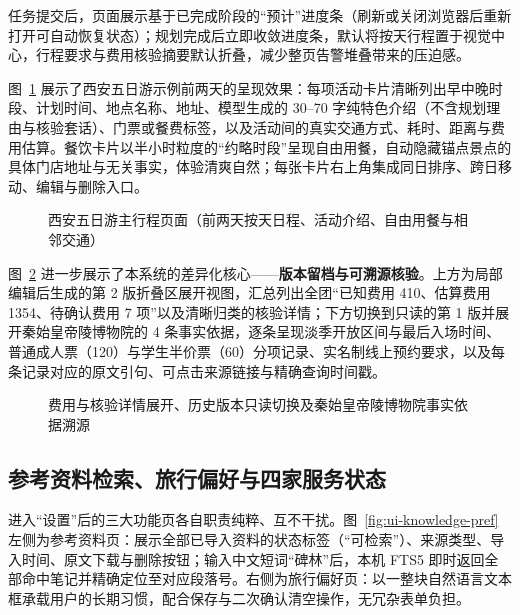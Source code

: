 任务提交后，页面展示基于已完成阶段的“预计”进度条（刷新或关闭浏览器后重新打开可自动恢复状态）；规划完成后立即收敛进度条，默认将按天行程置于视觉中心，行程要求与费用核验摘要默认折叠，减少整页告警堆叠带来的压迫感。

图~\ref{fig:ui-itinerary-5days} 展示了西安五日游示例前两天的呈现效果：每项活动卡片清晰列出早中晚时段、计划时间、地点名称、地址、模型生成的 30--70 字纯特色介绍（不含规划理由与核验套话）、门票或餐费标签，以及活动间的真实交通方式、耗时、距离与费用估算。餐饮卡片以半小时粒度的“约略时段”呈现自由用餐，自动隐藏锚点景点的具体门店地址与无关事实，体验清爽自然；每张卡片右上角集成同日排序、跨日移动、编辑与删除入口。

\begin{figure}[H]
  \centering
  \caption{西安五日游主行程页面（前两天按天日程、活动介绍、自由用餐与相邻交通）}
  \label{fig:ui-itinerary-5days}
\end{figure}

图~\ref{fig:ui-evidence-versions} 进一步展示了本系统的差异化核心——\textbf{版本留档与可溯源核验}。上方为局部编辑后生成的第 2 版折叠区展开视图，汇总列出全团“已知费用 \textyen{}410、估算费用 \textyen{}1354、待确认费用 7 项”以及清晰归类的核验详情；下方切换到只读的第 1 版并展开秦始皇帝陵博物院的 4 条事实依据，逐条呈现淡季开放区间与最后入场时间、普通成人票（\textyen{}120）与学生半价票（\textyen{}60）分项记录、实名制线上预约要求，以及每条记录对应的原文引句、可点击来源链接与精确查询时间戳。

\begin{figure}[H]
  \centering
  \caption{费用与核验详情展开、历史版本只读切换及秦始皇帝陵博物院事实依据溯源}
  \label{fig:ui-evidence-versions}
\end{figure}

\subsection{参考资料检索、旅行偏好与四家服务状态}

进入“设置”后的三大功能页各自职责纯粹、互不干扰。图~\ref{fig:ui-knowledge-pref} 左侧为参考资料页：展示全部已导入资料的状态标签（“可检索”）、来源类型、导入时间、原文下载与删除按钮；输入中文短词“碑林”后，本机 FTS5 即时返回全部命中笔记并精确定位至对应段落号。右侧为旅行偏好页：以一整块自然语言文本框承载用户的长期习惯，配合保存与二次确认清空操作，无冗杂表单负担。


